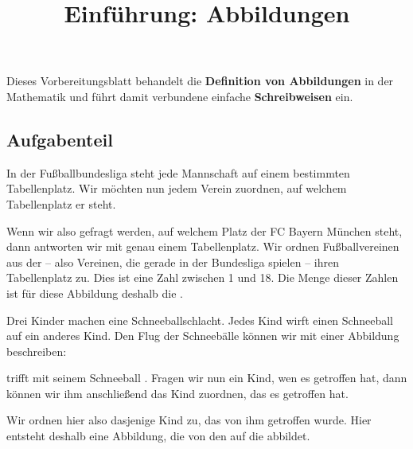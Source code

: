 \documentclass[]{uebungsblatt}
\title{Einführung: Abbildungen}
\begin{document}
\maketitle
\begin{contents}
    Dieses Vorbereitungsblatt behandelt die \textbf{Definition von Abbildungen} in der Mathematik und
    führt damit verbundene einfache \textbf{Schreibweisen} ein.
\end{contents}


\subsection*{Aufgabenteil}
\begin{exercise}
    In der Fußballbundesliga steht jede Mannschaft auf einem bestimmten Tabellenplatz. Wir möchten nun jedem Verein zuordnen, auf welchem Tabellenplatz er steht.
        
    Wenn wir also gefragt werden, auf welchem Platz der FC Bayern München steht, dann antworten wir mit genau einem Tabellenplatz. Wir ordnen Fußballvereinen aus der  -- also Vereinen, die gerade in der Bundesliga spielen -- ihren Tabellenplatz zu. Dies ist eine Zahl zwischen 1 und 18. Die Menge dieser Zahlen ist für diese Abbildung deshalb die .
\end{exercise}  

\begin{exercise}
    Drei Kinder machen eine Schneeballschlacht. Jedes Kind wirft einen Schneeball auf ein anderes Kind. Den Flug der Schneebälle können wir mit einer Abbildung beschreiben:
        
     trifft mit seinem Schneeball . Fragen wir nun ein Kind, wen es getroffen hat, dann können wir ihm anschließend das Kind zuordnen, das es getroffen hat.
        
    Wir ordnen hier also  dasjenige Kind zu, das von ihm getroffen wurde. Hier entsteht deshalb eine Abbildung, die von den  auf die  abbildet.
\end{exercise}
\end{document}
